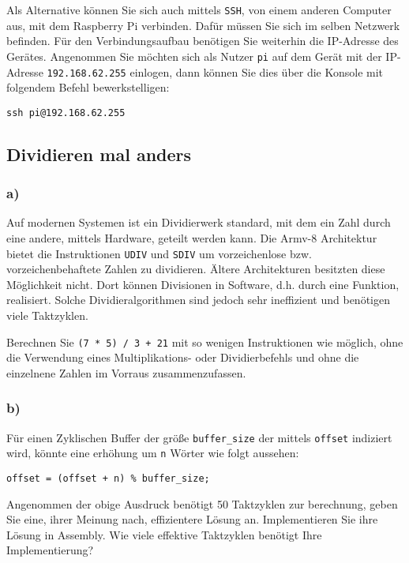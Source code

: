 \documentclass[12pt]{article}
\begin{document}
Als Alternative können Sie sich auch mittels \texttt{SSH},
von einem anderen Computer aus, mit dem Raspberry Pi verbinden. Dafür müssen Sie
sich im selben Netzwerk befinden. Für den Verbindungsaufbau benötigen Sie
weiterhin die IP-Adresse des Gerätes. Angenommen Sie möchten sich als Nutzer
\texttt{pi} auf dem Gerät mit der IP-Adresse \texttt{192.168.62.255} einlogen,
dann können Sie dies über die Konsole mit folgendem Befehl bewerkstelligen:

\begin{lstlisting}
ssh pi@192.168.62.255
\end{lstlisting}

\subsection{Dividieren mal anders}
\subsubsection{a)}
Auf modernen Systemen ist ein Dividierwerk standard, mit dem ein Zahl durch eine
andere, mittels Hardware, geteilt werden kann. Die Armv-8 Architektur bietet
die Instruktionen \texttt{UDIV} und \texttt{SDIV} um vorzeichenlose bzw.
vorzeichenbehaftete Zahlen zu dividieren. Ältere Architekturen besitzten diese
Möglichkeit nicht. Dort können Divisionen in Software, d.h. durch eine Funktion, realisiert. 
Solche Dividieralgorithmen sind jedoch sehr ineffizient und benötigen viele
Taktzyklen.

Berechnen Sie \texttt{(7 * 5) / 3 + 21} mit so wenigen Instruktionen wie
möglich, ohne die Verwendung eines Multiplikations- oder Dividierbefehls und
ohne die einzelnene Zahlen im Vorraus zusammenzufassen.

\subsubsection{b)}
Für einen Zyklischen Buffer der größe \texttt{buffer\_size} der mittels
\texttt{offset} indiziert wird, könnte eine erhöhung um \texttt{n} Wörter wie
folgt aussehen:

\begin{lstlisting}
offset = (offset + n) % buffer_size;
\end{lstlisting}

Angenommen der obige Ausdruck benötigt 50 Taktzyklen zur berechnung, geben Sie
eine, ihrer Meinung nach, effizientere Lösung an. Implementieren Sie ihre Lösung
in Assembly. Wie viele effektive Taktzyklen benötigt Ihre Implementierung?
\end{document}
